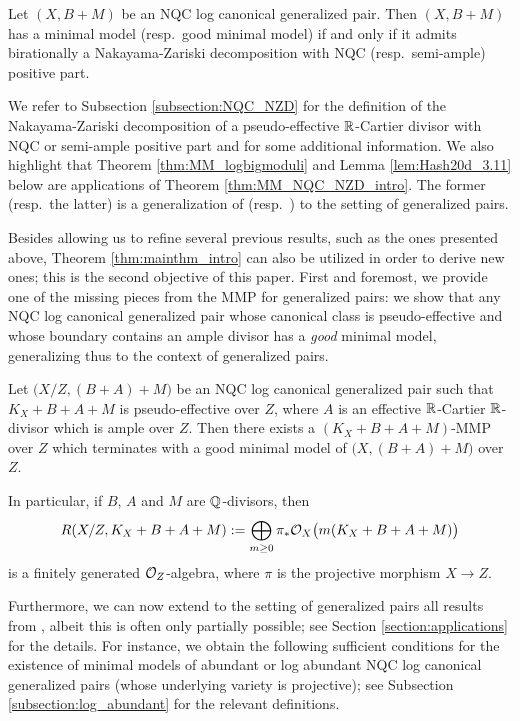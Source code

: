 	\begin{thmA}[= Theorem \ref{thm:MM_NQC_NZD}]
		\label{thm:MM_NQC_NZD_intro}
		Let $ (X,B+M) $ be an NQC log canonical generalized pair. Then $ (X,B+M) $ has a minimal model (resp.\ good minimal model) if and only if it admits birationally a Nakayama-Zariski decomposition with NQC (resp.\ semi-ample) positive part.
	\end{thmA}
	
	We refer to Subsection \ref{subsection:NQC_NZD} for the definition of the Nakayama-Zariski decomposition of a pseudo-effective $\mathbb{R}$-Cartier divisor with NQC or semi-ample positive part and for some additional information. We also highlight that Theorem \ref{thm:MM_logbigmoduli} and Lemma \ref{lem:Hash20d_3.11} below are applications of Theorem \ref{thm:MM_NQC_NZD_intro}. The former (resp.\ the latter) is a generalization of \cite[Theorem 4.5]{Hash22c} (resp.\ \cite[Lemma 3.11]{Hash20d}) to the setting of generalized pairs.
	
	\medskip
	
	Besides allowing us to refine several previous results, such as the ones presented above, Theorem \ref{thm:mainthm_intro} can also be utilized in order to derive new ones; this is the second objective of this paper. First and foremost, we provide one of the missing pieces from the MMP for generalized pairs: we show that any NQC log canonical generalized pair whose canonical class is pseudo-effective and whose boundary contains an ample divisor has a \emph{good} minimal model, generalizing thus \cite[Theorem 1.5]{HH20} to the context of generalized pairs.
	
	\begin{thmA}[= Theorem \ref{thm:EGMM_boundary_contains_ample} and Corollary \ref{cor:finite_generation}]
		Let $ \big( X/Z,(B+A)+M \big) $ be an NQC log canonical generalized pair such that $K_X+B+A+M$ is pseudo-effective over $Z$, where $ A $ is an effective $ \mathbb{R} $-Cartier $\mathbb{R}$-divisor which is ample over $ Z $. Then there exists a $(K_X+B+A+M)$-MMP over $Z$ which terminates with a good minimal model of $ \big( X,(B+A)+M \big) $ over $ Z $.
		
		In particular, if $B$, $A$ and $M$ are $\mathbb{Q}$-divisors, then
		\[ R(X/Z,K_X+B+A+M) := \bigoplus_{m \geq 0} \pi_* \mathcal{O}_X \big( m(K_X+B+A+M) \big) \]
		is a finitely generated $ \mathcal{O}_Z $-algebra, where $ \pi $ is the projective morphism $ X \to Z $.
	\end{thmA}
	
	Furthermore, we can now extend to the setting of generalized pairs all results from \cite[Subsection 3.2]{Hash20d}, albeit this is often only partially possible; see Section \ref{section:applications} for the details. For instance, we obtain the following sufficient conditions for the existence of minimal models of abundant or log abundant NQC log canonical generalized pairs (whose underlying variety is projective); see Subsection \ref{subsection:log_abundant} for the relevant definitions.
	
